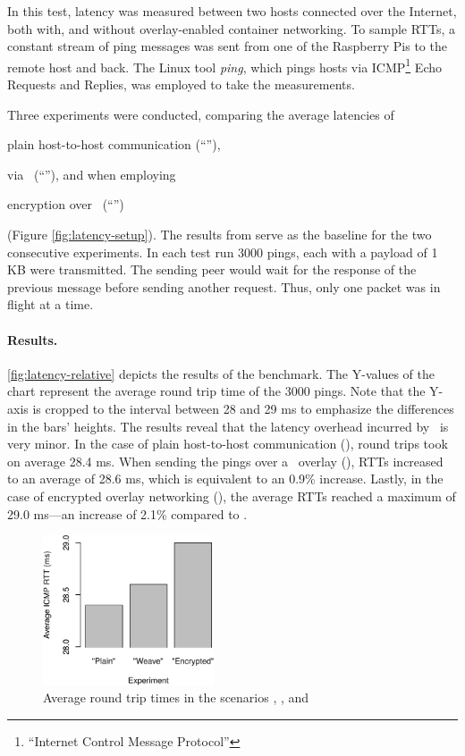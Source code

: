 In this test, latency was measured between two hosts connected over the Internet, both with, and without overlay-enabled container networking. To sample RTTs, a constant stream of ping messages was sent from one of the Raspberry Pis to the remote host and back. The Linux tool \emph{ping}, which pings hosts via ICMP\footnote{``Internet Control Message Protocol''} Echo Requests and Replies, was employed to take the measurements. 

Three experiments were conducted, comparing the average latencies of 
\begin{inparaenum}[(a)]
  \item plain host-to-host communication (``''),
  \item via \wnet\ (``''), and when employing
  \item encryption over \wnet\ (``'')
\end{inparaenum}
(\cf Figure \ref{fig:latency-setup}). The results from  serve as the baseline for the two consecutive experiments. In each test run 3000 pings, each with a payload of 1 KB were transmitted. The sending peer would wait for the response of the previous message before sending another request. Thus, only one packet was in flight at a time.

\paragraph{Results.} \autoref{fig:latency-relative} depicts the results of the benchmark. The Y-values of the chart represent the average round trip time of the 3000 pings. Note that the Y-axis is cropped to the interval between 28 and 29 ms to emphasize the differences in the bars' heights. The results reveal that the latency overhead incurred by \wnet\ is very minor. In the case of plain host-to-host communication (), round trips took on average 28.4 ms. When sending the pings over a \weave\ overlay (), RTTs increased to an average of 28.6 ms, which is equivalent to an 0.9\% increase. Lastly, in the case of encrypted overlay networking (), the average RTTs reached a maximum of 29.0 ms---an increase of 2.1\% compared to .
\begin{figure}[htpb]
  \centering
  \includegraphics[width=0.45\textwidth]{figures/ping-bar}
  \caption[\weave\ latency experiment results]{Average round trip times in the scenarios , , and }\label{fig:latency-relative}
\end{figure}
%
%
%
%
%
%
%
%
%
%
